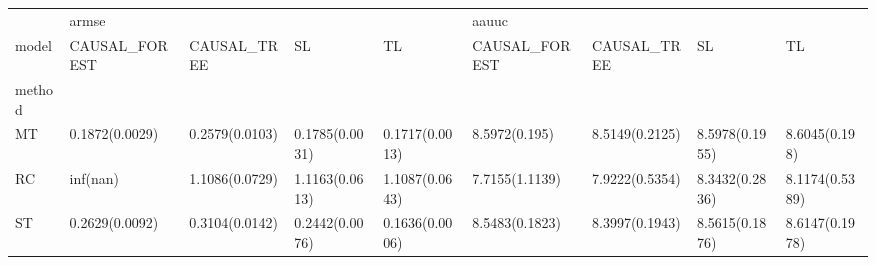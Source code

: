 \begin{tabular}{lllllllll}
\toprule
{} & \multicolumn{4}{l}{armse} & \multicolumn{4}{l}{aauuc} \\
model &   CAUSAL\_FOREST &     CAUSAL\_TREE &              SL &              TL &   CAUSAL\_FOREST &     CAUSAL\_TREE &              SL &              TL \\
method &                 &                 &                 &                 &                 &                 &                 &                 \\
\midrule
MT     &  0.1872(0.0029) &  0.2579(0.0103) &  0.1785(0.0031) &  0.1717(0.0013) &   8.5972(0.195) &  8.5149(0.2125) &  8.5978(0.1955) &   8.6045(0.198) \\
RC     &        inf(nan) &  1.1086(0.0729) &  1.1163(0.0613) &  1.1087(0.0643) &  7.7155(1.1139) &  7.9222(0.5354) &  8.3432(0.2836) &  8.1174(0.5389) \\
ST     &  0.2629(0.0092) &  0.3104(0.0142) &  0.2442(0.0076) &  0.1636(0.0006) &  8.5483(0.1823) &  8.3997(0.1943) &  8.5615(0.1876) &  8.6147(0.1978) \\
\bottomrule
\end{tabular}
